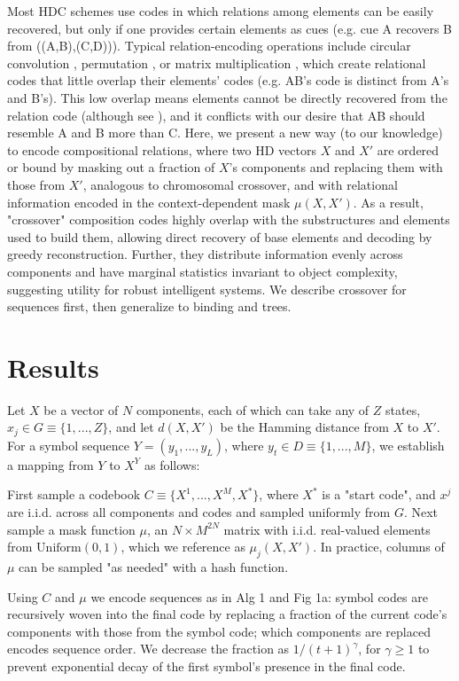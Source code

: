 \documentclass{article}
\begin{document}
Most HDC schemes use codes in which relations among elements can be easily recovered, but only if one provides certain elements as cues (e.g. cue A recovers B from ((A,B),(C,D))). Typical relation-encoding operations include circular convolution \cite{Plate:1995}, permutation \cite{Gayler:1998, Sahlgren:2008}, or matrix multiplication \cite{Gosmann:2019}, which create relational codes that little overlap their elements' codes (e.g. AB's code is distinct from A's and B's). This low overlap means elements cannot be directly recovered from the relation code (although see \cite{Rachkovskij:2001}), and it conflicts with our desire that AB should resemble A and B more than C. Here, we present a new way (to our knowledge) to encode compositional relations, where two HD vectors $X$ and $X'$ are ordered or bound by masking out a fraction of $X$'s components and replacing them with those from $X'$, analogous to chromosomal crossover, and with relational information encoded in the context-dependent mask $\mu(X, X')$. As a result, "crossover" composition codes highly overlap with the substructures and elements used to build them, allowing direct recovery of base elements and decoding by greedy reconstruction. Further, they distribute information evenly across components and have marginal statistics invariant to object complexity, suggesting utility for robust intelligent systems. We describe crossover for sequences first, then generalize to binding and trees.

\section{Results}

Let $X$ be a vector of $N$ components, each of which can take any of $Z$ states, $x_j \in G \equiv \{1,...,Z\}$, and let $d(X, X')$ be the Hamming distance from $X$ to $X'$. For a symbol sequence $Y = (y_1, ..., y_L)$, where $y_t \in D \equiv \{1, ..., M\}$, we establish a mapping from $Y$ to $X^Y$ as follows:

First sample a codebook $C \equiv \{X^1, ..., X^M, X^*\}$, where $X^*$ is a "start code", and $x^j$ are i.i.d. across all components and codes and sampled uniformly from $G$. Next sample a mask function $\mu$, an $N \times M^{2N}$ matrix with i.i.d. real-valued elements from $\textrm{Uniform}(0, 1)$, which we reference as $\mu_j(X, X')$. In practice, columns of $\mu$ can be sampled "as needed" with a hash function.

Using $C$ and $\mu$ we encode sequences as in Alg 1 and Fig 1a: symbol codes are recursively woven into the final code by replacing a fraction of the current code's components with those from the symbol code; which components are replaced encodes sequence order. We decrease the fraction as $1/(t+1)^\gamma$, for $\gamma \geq 1$ to prevent exponential decay of the first symbol's presence in the final code.
\end{document}
